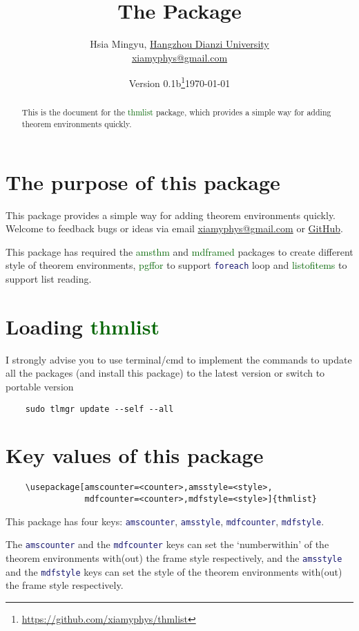 \documentclass[11pt,svgnames]{article}
\title{\bfseries The \pkg{thmlist} Package}
\author{%
    Hsia Mingyu, \href{https://www.hdu.edu.cn}{Hangzhou Dianzi University}\\
    \href{mailto:xiamyphys@gmail.com}{\ttfamily xiamyphys@gmail.com}}
\date{Version 0.1b\quad\thanks{\url{https://github.com/xiamyphys/thmlist}}\today}
\def\pkg#1{\textcolor{DarkGreen}{\textsf{#1}}}
\def\cmd#1{\textcolor{MidnightBlue}{\texttt{\string#1}}}
\begin{document}
\def\theexample{\arabic{example}}\let\theremark=\relax

\maketitle\vspace*{-4ex}

\begin{abstract}
This is the document for the \pkg{thmlist} package, which provides a simple way for adding theorem environments quickly.
\end{abstract}

\section{The purpose of this package}
This package provides a simple way for adding theorem environments quickly. Welcome to feedback bugs or ideas via email \href{mailto:xiamyphys@gmail.com}{\ttfamily xiamyphys@gmail.com} or \href{https://github.com/xiamyphys/thmlist}{GitHub}.

This package has required the \pkg{amsthm} and \pkg{mdframed} packages to create different style of theorem environments, \pkg{pgffor} to support \cmd{foreach} loop and \pkg{listofitems} to support list reading.

\section{Loading \pkg{thmlist}}
I strongly advise you to use terminal/cmd to implement the commands to update all the packages (and install this package) to the latest version or switch to portable version
\begin{verbatim}
    sudo tlmgr update --self --all
\end{verbatim}

\section{Key values of this package}
\begin{verbatim}
    \usepackage[amscounter=<counter>,amsstyle=<style>,
                mdfcounter=<counter>,mdfstyle=<style>]{thmlist}
\end{verbatim}

This package has four keys: \cmd{amscounter}, \cmd{amsstyle}, \cmd{mdfcounter}, \cmd{mdfstyle}.

The \cmd{amscounter} and the \cmd{mdfcounter} keys can set the `numberwithin' of the theorem environments with(out) the frame style respectively, and the \cmd{amsstyle} and the \cmd{mdfstyle} keys can set the style of the theorem environments with(out) the frame style respectively.
\end{document}
